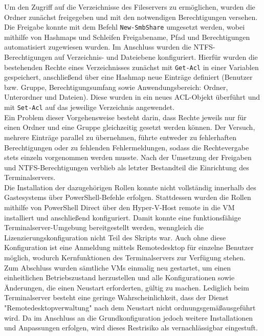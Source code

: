 \documentclass[a4paper,12pt]{article}
\begin{document}
Um den Zugriff auf die Verzeichnisse des Fileservers zu ermöglichen, wurden die Ordner zunächst freigegeben und mit den notwendigen Berechtigungen versehen.
Die Freigabe konnte mit dem Befehl \lstinline|New-SmbShare| umgesetzt werden, wobei mithilfe von Hashmaps und Schleifen Freigabename, Pfad und Berechtigungen automatisiert zugewiesen wurden.
Im Anschluss wurden die NTFS-Berechtigungen auf Verzeichnis- und Dateiebene konfiguriert.
Hierfür wurden die bestehenden Rechte eines Verzeichnisses zunächst mit \lstinline|Get-Acl| in einer Variablen gespeichert, anschlie\ss end über eine Hashmap neue Einträge definiert (Benutzer bzw. Gruppe, Berechtigungsumfang sowie Anwendungsbereich: Ordner, Unterordner und Dateien).
Diese wurden in ein neues ACL-Objekt überführt und mit \lstinline|Set-Acl| auf das jeweilige Verzeichnis angewendet.\\

Ein Problem dieser Vorgehensweise besteht darin, dass Rechte jeweils nur für einen Ordner und eine Gruppe gleichzeitig gesetzt werden können. 
Der Versuch, mehrere Einträge parallel zu übernehmen, führte entweder zu fehlerhaften Berechtigungen oder zu fehlenden Fehlermeldungen, sodass die Rechtevergabe stets einzeln vorgenommen werden musste. 
Nach der Umsetzung der Freigaben und NTFS-Berechtigungen verblieb als letzter Bestandteil die Einrichtung des Terminalservers.\\

Die Installation der dazugehörigen Rollen konnte nicht vollständig innerhalb des Gastesystems über PowerShell-Befehle erfolgen. 
Stattdessen wurden die Rollen mithilfe von PowerShell Direct über den Hyper-V-Host remote in die VM installiert und anschlie\ss end konfiguriert. 
Damit konnte eine funktionsfähige Terminalserver-Umgebung bereitgestellt werden, wenngleich die Lizenzierungskonfiguration nicht Teil des Skripts war. 
Auch ohne diese Konfiguration ist eine Anmeldung mittels Remotedesktop für einzelne Benutzer möglich, wodurch Kernfunktionen des Terminalservers zur Verfügung stehen.\\

Zum Abschluss wurden sämtliche VMs einmalig neu gestartet, um einen einheitlichen Betriebszustand herzustellen und alle Konfigurationen sowie Änderungen, die einen Neustart erforderten, gültig zu machen. 
Lediglich beim Terminalserver besteht eine geringe Wahrscheinlichkeit, dass der Dienst "Remotedesktopverwaltung" nach dem Neustart nicht ordnungsgemä\ss  ausgeführt wird. 
Da im Anschluss an die Grundkonfiguration jedoch weitere Installationen und Anpassungen erfolgen, wird dieses Restrisiko als vernachlässigbar eingestuft.\\
\end{document}
